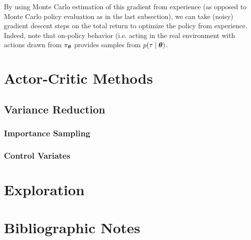 By using Monte Carlo estimation of this gradient from experience (as opposed to Monte Carlo policy evaluation as in the last subsection), we can take (noisy) gradient descent steps on the total return to optimize the policy from experience. Indeed, note that on-policy behavior (i.e. acting in the real environment with actions drawn from $\pi_{\bm{\theta}}$ provides samples from $p(\tau\mid \bm{\theta})$.



\section{Actor-Critic Methods}



\subsection{Variance Reduction}

\subsubsection{Importance Sampling}

\subsubsection{Control Variates}

\section{Exploration}

\section{Bibliographic Notes}